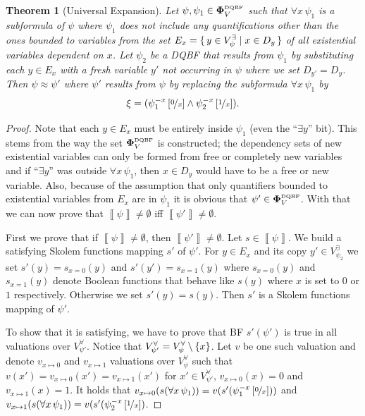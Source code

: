 \documentclass[
  digital, %
  color,
  twoside, %
  table,   %
  nolof,     %
  nolot,     %
]{fithesis3}
\let\setbuilder\set
\newcommand{\simpleset}[1]{\{{#1}\}}
\renewcommand{\set}[1]{\normalexpandarg\IfSubStr{#1}{|}{\setbuilder{#1}}{\simpleset{#1}}}
\newtheorem{theorem}{Theorem}[chapter] %
\theoremstyle{definition}
\theoremstyle{remark}
\newcommand{\seman}[1]{\left\llbracket {#1} \right\rrbracket}
\newcommand{\substitute}[2]{\left[ \nicefrac{#2}{#1} \right]}
\newcommand{\DQBF}[1]{\mathbf{\Phi}_{#1}^{\normalfont{\text{\tiny DQBF}}}}
\newcommand{\evars}[1]{V_{#1}^{\exists}}
\newcommand{\uvars}[1]{V_{#1}^{\forall}}
\newcommand{\itholds}{\,}
\begin{document}
\begin{theorem}[Universal Expansion]
\label{thrm:unExpan}
  Let $\psi, \psi_1 \in \DQBF{V}$ such that $\forall x \itholds \psi_1$ is a subformula of $\psi$ where $\psi_1$ does not include any quantifications other than the ones bounded to variables from the set $E_{x} = \set{y \in \evars{\psi} | x \in D_y}$ of all existential variables dependent on $x$. Let $\psi_2$ be a DQBF that results from $\psi_1$ by substituting each $y \in E_x$ with a fresh variable $y'$ not occurring in $\psi$ where we set $D_{y'} = D_y$. Then $\psi \approx \psi'$ where $\psi'$ results from $\psi$ by replacing the subformula $\forall x \itholds \psi_1$ by 
  \[\xi = (\psi_1^{-x}\substitute{x}{0} \land \psi_2^{-x}\substitute{x}{1}).\]
\end{theorem}
\begin{proof}
  Note that each $y \in E_x$ must be entirely inside $\psi_1$ (even the ``$\exists y$'' bit). This stems from the way the set $\DQBF{V}$ is constructed; the dependency sets of new existential variables can only be formed from free or completely new variables and if ``$\exists y$'' was outside $\forall x \itholds \psi_1$, then $x \in D_y$ would have to be a free or new variable. Also, because of the assumption that only quantifiers bounded to existential variables from $E_x$
  are in $\psi_1$ it is obvious that $\psi' \in \DQBF{V}$. With that we can now prove that $\seman{\psi} \not= \emptyset$ iff $\seman{\psi'} \not= \emptyset$.
  
  First we prove that if $\seman{\psi} \not= \emptyset$, then $\seman{\psi'} \not= \emptyset$. Let $s \in \seman{\psi}$. We build a satisfying Skolem functions mapping $s'$ of $\psi'$. For $y \in E_x$ and its copy $y' \in \evars{\psi_2}$ we set $s'(y) = s_{x=0}(y)$ and $s'(y') = s_{x=1}(y)$ where $s_{x=0}(y)$ and $s_{x=1}(y)$ denote Boolean functions that behave like $s(y)$ where $x$ is set to $0$ or $1$ respectively. Otherwise we set $s'(y) = s(y)$. Then $s'$ is a Skolem functions mapping of $\psi'$.
  
  To show that it is satisfying, we have to prove that BF $s'(\psi')$ is true in all valuations over $\uvars{\psi'}$. Notice that $\uvars{\psi'} = \uvars{\psi} \setminus \set{x}$. Let $v$ be one such valuation and denote $v_{x\mapsto0}$ and $v_{x\mapsto1}$ valuations over $\uvars{\psi}$ such that $v(x') = v_{x\mapsto0}(x') = v_{x\mapsto1}(x')$ for $x' \in \uvars{\psi'}$, $v_{x\mapsto0}(x) = 0$ and $v_{x\mapsto1}(x) = 1$. It holds that $v_{x\mapsto0}(s(\forall x\itholds\psi_1)) = v(s'(\psi_1^{-x}\substitute{x}{0}))$ and $v_{x\mapsto1}(s(\forall x\itholds\psi_1)) = v(s'(\psi_2^{-x}\substitute{x}{1})$.
  

\end{proof}
\end{document}
